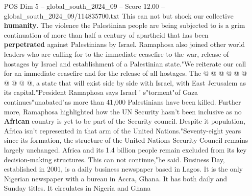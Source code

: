 \begin{textsample}{POS Dim 5 – global\_south\_2024\_09 – Score 12.00 – global\_south\_2024\_09/114835700.txt}
This can not but shock our collective \textbf{humanity}.
The violence the Palestinian people are being subjected to is a grim continuation of more than half a century of apartheid that has been \textbf{perpetrated} against Palestinians by Israel.
Ramaphosa also joined other world leaders who are calling for to the immediate ceasefire to the war, release of hostages by Israel and establishment of a Palestinian state."We reiterate our call for an immediate ceasefire and for the release of all hostages.
The @ @ @ @ @ @ @ @ @ @, a state that will exist side by side with Israel, with East Jerusalem as its capital."President Ramaphosa says Israel ' s"torment"of Gaza continues"unabated"as more than 41,000 Palestinians have been killed.
Further more, Ramaphosa highlighted how the UN Security hasn't been inclusive as no \textbf{African} country is yet to be part of the Security council.
Despite it population, Africa isn't represented in that arm of the United Nations."Seventy-eight years since its formation, the structure of the United Nations Security Council remains largely unchanged.
Africa and its 1.4 billion people remain excluded from its key decision-making structures.
This can not continue,"he said.
Business Day, established in 2001, is a daily business newspaper based in Lagos.
It is the only Nigerian newspaper with a bureau in Accra, Ghana.
It has both daily and Sunday titles.
It circulates in Nigeria and Ghana

\end{textsample}
